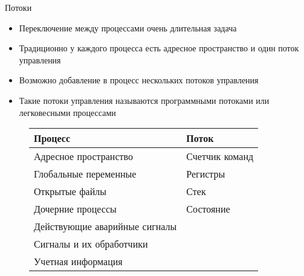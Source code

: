 \documentclass[aspectratio=169,14pt]{beamer}
\begin{document}
\begin{frame}{Потоки}
    \begin{itemize}
        \item Переключение между процессами очень длительная задача
        \item Традиционно у каждого процесса есть адресное пространство и
        один поток управления
        \item Возможно добавление в процесс нескольких потоков управления
        \item Такие потоки управления называются программными потоками
        или легковесными процессами
    \end{itemize}
    \begin{figure}[htp]
        \centering
        \begin{tiny}
            \begin{tabular}{p{4cm}p{4cm}}
                \hline
                \textbf{Процесс} & \textbf{Поток} \\ \hline
                Адресное пространство & Счетчик команд \\
                Глобальные переменные & Регистры \\
                Открытые файлы & Стек \\
                Дочерние процессы &  Состояние \\
                Действующие аварийные сигналы & \\
                Сигналы и их обработчики &  \\
                Учетная информация &  \\
            \end{tabular}
        \end{tiny}
    \end{figure}
\end{frame}
\end{document}
